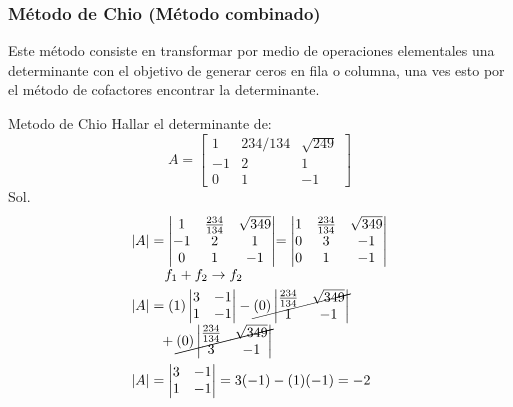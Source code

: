 \subsubsection*{Método de Chio (Método combinado)}
Este método consiste en transformar por medio de operaciones elementales una determinante con el objetivo de generar ceros en fila o columna, una ves esto por el método de cofactores encontrar la determinante.
\begin{Example*} {Metodo de Chio}
	Hallar el determinante de:
	$$ A=\begin{bmatrix}
		1&234/134&\sqrt{249}\\
		-1&2&1\\
		0&1&-1
	\end{bmatrix} $$
	Sol.
	\begin{align*}
		&\begin{matrix}
			|A|=\begin{vmatrix}
				1&\frac{234}{134}&\sqrt{349}\\
				-1&2&1\\
				0&1&-1
			\end{vmatrix}\\
			f_1+f_2\rightarrow f_2
		\end{matrix} \begin{matrix}
			=\begin{vmatrix}
				1&\frac{234}{134}&\sqrt{349}\\
				0&3&-1\\
				0&1&-1
			\end{vmatrix}\\
			\
		\end{matrix}\\
		&|A|=(1)\begin{vmatrix}
			3&-1\\
			1&-1
		\end{vmatrix}-\cancel{(0)\begin{vmatrix}
			\frac{234}{134}&\sqrt{349}\\
			1&-1
		\end{vmatrix}}\\
		&\quad\quad+\cancel{(0)\begin{vmatrix}
			\frac{234}{134}&\sqrt{349}\\
			3&-1
		\end{vmatrix}}\\
		&|A|=\begin{vmatrix}
			3&-1\\
			1&-1
		\end{vmatrix}=3(-1)-(1)(-1)=-2
	\end{align*}
\end{Example*}